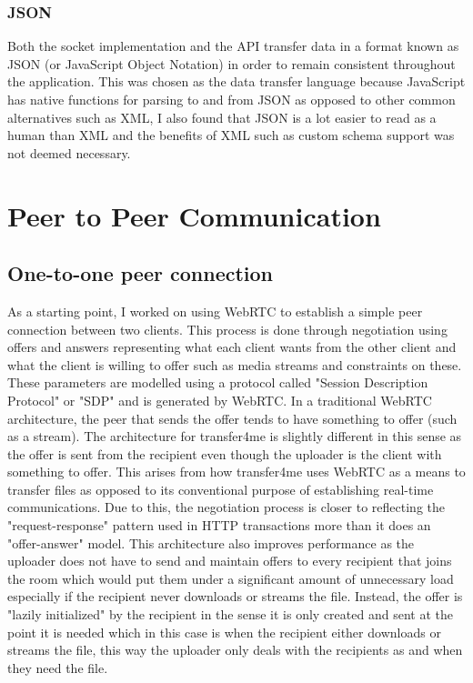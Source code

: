 \documentclass[]{report}
\begin{document}
				\subsubsection{JSON}
				Both the socket implementation and the API transfer data in a format known as JSON (or JavaScript Object Notation) in order to remain consistent throughout the application. This was chosen as the data transfer language because JavaScript has native functions for parsing to and from JSON as opposed to other common alternatives such as XML, I also found that JSON is a lot easier to read as a human than XML and the benefits of XML such as custom schema support was not deemed necessary.
		
		\section{Peer to Peer Communication}
			\subsection{One-to-one peer connection}
			As a starting point, I worked on using WebRTC to establish a simple peer connection between two clients. This process is done through negotiation using offers and answers representing what each client wants from the other client and what the client is willing to offer such as media streams and constraints on these. These parameters are modelled using a protocol called "Session Description Protocol" or "SDP" and is generated by WebRTC. In a traditional WebRTC architecture, the peer that sends the offer tends to have something to offer (such as a stream). The architecture for transfer4me is slightly different in this sense as the offer is sent from the recipient even though the uploader is the client with something to offer. This arises from how transfer4me uses WebRTC as a means to transfer files as opposed to its conventional purpose of establishing real-time communications. Due to this, the negotiation process is closer to reflecting the "request-response" pattern used in HTTP transactions more than it does an "offer-answer" model. This architecture also improves performance as the uploader does not have to send and maintain offers to every recipient that joins the room which would put them under a significant amount of unnecessary load especially if the recipient never downloads or streams the file. Instead, the offer is "lazily initialized" by the recipient in the sense it is only created and sent at the point it is needed which in this case is when the recipient either downloads or streams the file, this way the uploader only deals with the recipients as and when they need the file. 
			
\end{document}

